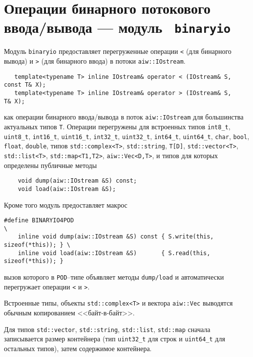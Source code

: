 \section{Операции бинарного потокового ввода/вывода --- модуль {\tt
  binaryio}}\label{binaryio:sec}
Модуль \verb'binaryio' предоставляет перегруженные операции \verb'<' (для бинарного вывода) и \verb'>' (для бинарного ввода)
в потоки \verb'aiw::IOstream'.
\begin{verbatim}
   template<typename T> inline IOstream& operator < (IOstream& S, const T& X);
   template<typename T> inline IOstream& operator > (IOstream& S,       T& X);
\end{verbatim}
как операции бинарного ввода/вывода в поток \verb'aiw::IOstream' для большинства актуальных типов \verb'T'.
Операции перегружены для встроенных типов \verb'int8_t', \verb'uint8_t', \verb'int16_t', \verb'uint16_t', \verb'int32_t', \verb'uint32_t', \verb'int64_t', \verb'uint64_t',
\verb'char', \verb'bool', \verb'float', \verb'double', типов \verb'std::complex<T>', \verb'std::string',
\verb'T[D]', \verb'std::vector<T>', \verb'std::list<T>', \verb'std::map<T1,T2>', \verb'aiw::Vec<D,T>',
и типов для которых определены публичные методы
\begin{verbatim}
    void dump(aiw::IOstream &S) const;
    void load(aiw::IOstream &S);
\end{verbatim}
Кроме того модуль предоставляет макрос
\begin{verbatim}
#define BINARYIO4POD                                                           \
    inline void dump(aiw::IOstream &S) const { S.write(this, sizeof(*this)); } \
    inline void load(aiw::IOstream &S)       { S.read(this, sizeof(*this)); }  
\end{verbatim}
вызов которого в \verb'POD'--типе объявляет методы \verb'dump/load' и автоматически перегружает операции \verb'<' и \verb'>'.

Встроенные типы, объекты \verb'std::complex<T>' и вектора \verb'aiw::Vec' выводятся обычным копированием <<байт-в-байт>>.

Для типов \verb'std::vector', \verb'std::string', \verb'std::list', \verb'std::map' сначала записывается размер контейнера
(тип \verb'uint32_t' для строк и \verb'uint64_t' для остальных типов), затем содержимое контейнера.
